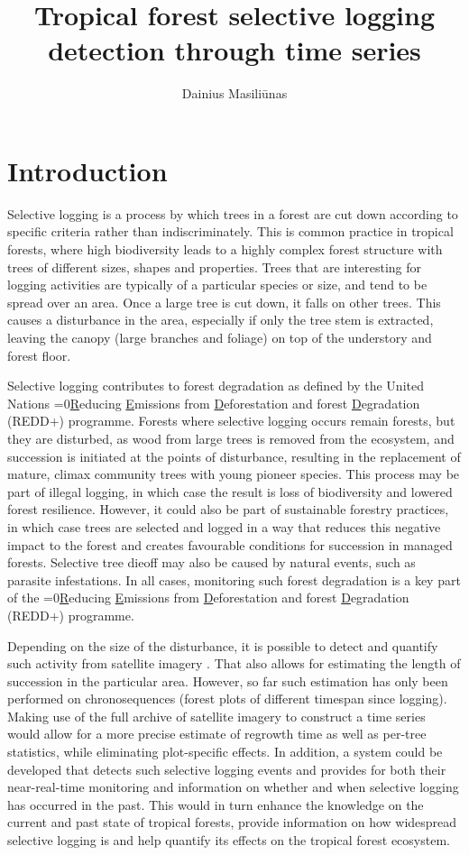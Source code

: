 \documentclass[a4paper,10pt]{article}
\title{Tropical forest selective logging detection through time series}
\author{Dainius Masiliūnas}
\newcounter{reddcount}
\newcommand{\redd}{\ifnum\value{reddcount}=0{\underline{R}educing \underline{E}missions from \underline{D}eforestation and forest \underline{D}egradation (REDD+)}\else{REDD+}\fi\stepcounter{reddcount}}
\begin{document}
\maketitle

\section{Introduction}

Selective logging is a process by which trees in a forest are cut down according to specific criteria rather than indiscriminately. This is common practice in tropical forests, where high biodiversity leads to a highly complex forest structure with trees of different sizes, shapes and properties. Trees that are interesting for logging activities are typically of a particular species or size, and tend to be spread over an area. Once a large tree is cut down, it falls on other trees. This causes a disturbance in the area, especially if only the tree stem is extracted, leaving the canopy (large branches and foliage) on top of the understory and forest floor.

Selective logging contributes to forest degradation as defined by the United Nations \redd{} programme. Forests where selective logging occurs remain forests, but they are disturbed, as wood from large trees is removed from the ecosystem, and succession is initiated at the points of disturbance, resulting in the replacement of mature, climax community trees with young pioneer species. This process may be part of illegal logging, in which case the result is loss of biodiversity and lowered forest resilience. However, it could also be part of sustainable forestry practices, in which case trees are selected and logged in a way that reduces this negative impact to the forest and creates favourable conditions for succession in managed forests. Selective tree dieoff may also be caused by natural events, such as parasite infestations. In all cases, monitoring such forest degradation is a key part of the \redd{} programme.

Depending on the size of the disturbance, it is possible to detect and quantify such activity from satellite imagery \citep{broadbent_recovery_2006}. That also allows for estimating the length of succession in the particular area. However, so far such estimation has only been performed on chronosequences (forest plots of different timespan since logging). Making use of the full archive of satellite imagery to construct a time series would allow for a more precise estimate of regrowth time as well as per-tree statistics, while eliminating plot-specific effects. In addition, a system could be developed that detects such selective logging events and provides for both their near-real-time monitoring and information on whether and when selective logging has occurred in the past. This would in turn enhance the knowledge on the current and past state of tropical forests, provide information on how widespread selective logging is and help quantify its effects on the tropical forest ecosystem.
\end{document}
